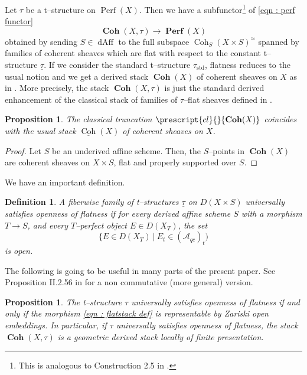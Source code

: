 \documentclass[11pt]{article}
\newtheorem{definition}{Definition}
\newtheorem{proposition}[theorem]{Proposition}
\newcommand{\coh}{\operatorname{Coh}}
\newcommand{\perf}{\operatorname{Perf}(X)}
\newcommand{\perfstack}{\boldsymbol{\operatorname{Perf}}(X)}
\newcommand{\cohflat}{\boldsymbol{\operatorname{Coh}}}
\begin{document}
    
    \noindent Let $\tau$ be a t--structure on $\perf$. Then we have a subfunctor\footnote{This is analogous to Construction 2.5 in \cite{Porta2019TwodimensionalCH}.} of \eqref{eqn : perf functor}
    \begin{equation}\label{eqn : flatstack def}
        \cohflat(X,\tau) \longrightarrow \perfstack
    \end{equation}
   obtained by sending $S\in \operatorname{dAff}$ to the full subspace $\coh_S(X\times S)^{\simeq}$ spanned by families of coherent sheaves which are flat with respect to the constant t--structure $\underline{\tau}$. If we consider the standard t--structure $\tau_{\operatorname{std}}$, flatness reduces to the usual notion and we get a derived stack $\cohflat(X)$ of coherent sheaves on $X$ as in \cite{Porta2019TwodimensionalCH}. More precisely, the stack $\cohflat(X,\tau)$ is just the standard derived enhancement of the classical stack of families of $\tau$--flat sheaves defined in \cite{Bayer_2021}.
    
    \begin{proposition}
        The classical truncation $\prescript{cl}{}{\cohflat(X)}$ coincides with the usual stack $\underline{\coh}(X)$ of coherent sheaves on $X$.
    \end{proposition}
    \begin{proof}
        Let $S$ be an underived affine scheme. Then, the $S$--points in $\cohflat(X)$ are coherent sheaves on $X\times S$, flat and properly supported over $S$.
    \end{proof}

    \noindent We have an important definition.

    
    \begin{definition}
        A fiberwise family of t--structures $\underline{\tau}$ on $D(X \times S)$ \textit{universally satisfies openness of flatness} if for every derived affine scheme $S$ with a morphism $T\rightarrow S$, and every $T$--perfect object $E\in D(X_T)$, the set
        \[
            \{E\in D(X_T)\ \big| \ E_t \in (\mathcal{A}_{qc})_t)        
       \]
       is open.
    \end{definition}

    \noindent The following is going to be useful in many parts of the present paper. See Proposition II.2.56 in \cite{dps} for a non commutative (more general) version.
    
    \begin{proposition}\label{prop : geom locally finite presentation}
        The t--structure $\tau$ universally satisfies openness of flatness if and only if the morphism \eqref{eqn : flatstack def} is representable by Zariski open embeddings. In particular, if $\tau$ universally satisfies openness of flatness, the stack $\cohflat(X,\tau)$ is a geometric derived stack locally of finite presentation. 
    \end{proposition}
\end{document}
